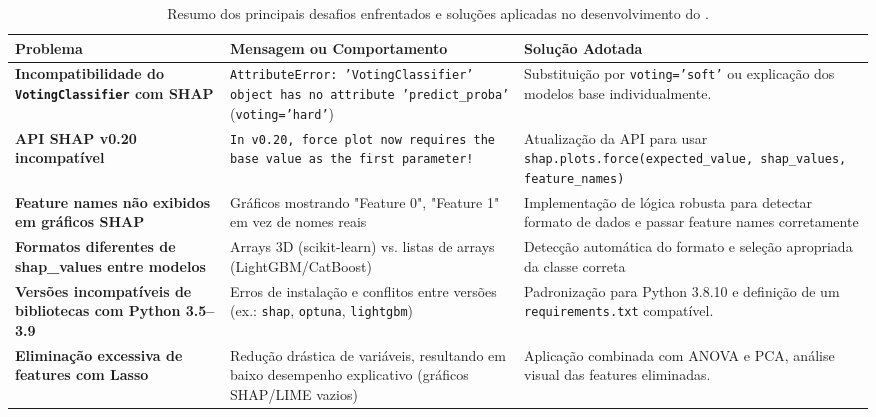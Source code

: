 \begin{table}[ht]
\centering
\caption{Resumo dos principais desafios enfrentados e soluções aplicadas no desenvolvimento do \toolname{}.}
\label{tab:erros}
\begin{tabular}{|p{4.3cm}|p{4.6cm}|p{5.1cm}|}
\hline
\textbf{Problema} & \textbf{Mensagem ou Comportamento} & \textbf{Solução Adotada} \\
\hline

\textbf{Incompatibilidade do \texttt{VotingClassifier} com SHAP} & 
\texttt{AttributeError: 'VotingClassifier' object has no attribute 'predict\_proba'} (\texttt{voting='hard'}) &
Substituição por \texttt{voting='soft'} ou explicação dos modelos base individualmente. \\

\hline

\textbf{API SHAP v0.20 incompatível} & 
\texttt{In v0.20, force plot now requires the base value as the first parameter!} &
Atualização da API para usar \texttt{shap.plots.force(expected\_value, shap\_values, feature\_names)} \\

\hline

\textbf{Feature names não exibidos em gráficos SHAP} & 
Gráficos mostrando "Feature 0", "Feature 1" em vez de nomes reais &
Implementação de lógica robusta para detectar formato de dados e passar feature names corretamente \\

\hline

\textbf{Formatos diferentes de shap\_values entre modelos} & 
Arrays 3D (scikit-learn) vs. listas de arrays (LightGBM/CatBoost) &
Detecção automática do formato e seleção apropriada da classe correta \\

\hline

\textbf{Versões incompatíveis de bibliotecas com Python 3.5–3.9} & 
Erros de instalação e conflitos entre versões (ex.: \texttt{shap}, \texttt{optuna}, \texttt{lightgbm}) & 
Padronização para Python 3.8.10 e definição de um \texttt{requirements.txt} compatível. \\

\hline

\textbf{Eliminação excessiva de features com Lasso} & 
Redução drástica de variáveis, resultando em baixo desempenho explicativo (gráficos SHAP/LIME vazios) &
Aplicação combinada com ANOVA e PCA, análise visual das features eliminadas. \\


\end{tabular}
\end{table}
